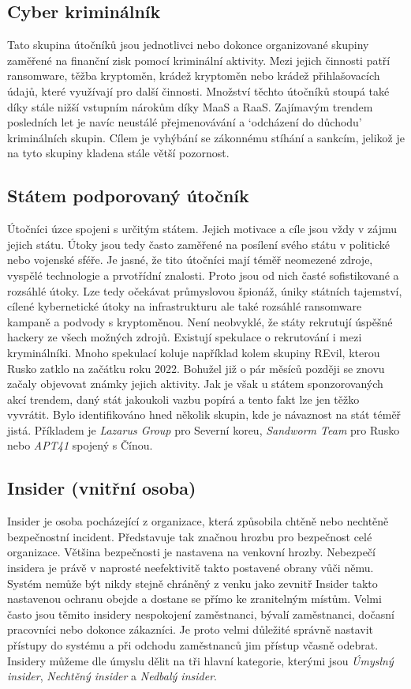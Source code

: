 \subsection{Cyber kriminálník}
Tato skupina útočníků jsou jednotlivci nebo dokonce organizované skupiny zaměřené na finanční zisk pomocí kriminální aktivity.
Mezi jejich činnosti patří ransomware, těžba kryptoměn, krádež kryptoměn nebo krádež přihlašovacích údajů, které využívají pro další činnosti.
Množství těchto útočníků stoupá také díky stále nižší vstupním nárokům díky \ac{MaaS}\cite{MaaS_ATaT} a \ac{RaaS}\cite{RaaS_microsoft}.
Zajímavým trendem posledních let je navíc neustálé přejmenovávání a `odcházení do důchodu' kriminálních skupin.
Cílem je vyhýbání se zákonnému stíhání a sankcím, jelikož je na tyto skupiny kladena stále větší pozornost.

\subsection{Státem podporovaný útočník}
Útočníci úzce spojeni s určitým státem.
Jejich motivace a cíle jsou vždy v zájmu jejich státu.
Útoky jsou tedy často zaměřené na posílení svého státu v politické nebo vojenské sféře.
Je jasné, že tito útočníci mají téměř neomezené zdroje, vyspělé technologie a prvotřídní znalosti.
Proto jsou od nich časté sofistikované a rozsáhlé útoky.
Lze tedy očekávat průmyslovou špionáž, úniky státních tajemství, cílené kybernetické útoky na infrastrukturu ale také rozsáhlé ransomware kampaně a podvody s kryptoměnou.
Není neobvyklé, že státy rekrutují úspěšné hackery ze všech možných zdrojů.
Existují spekulace o rekrutování i mezi kryminálníki.
Mnoho spekulací koluje například kolem skupiny REvil, kterou Rusko zatklo na začátku roku 2022\cite{REvil_story}.
Bohužel již o pár měsíců později se znovu začaly objevovat známky jejich aktivity.
Jak je však u státem sponzorovaných akcí trendem, daný stát jakoukoli vazbu popírá a tento fakt lze jen těžko vyvrátit.
Bylo identifikováno hned několik skupin, kde je návaznost na stát téměř jistá.
Příkladem je \textit{Lazarus Group} pro Severní koreu, \textit{Sandworm Team} pro Rusko nebo \textit{APT41} spojený s Čínou\cite{Mitre_groups}.

\subsection{Insider (vnitřní osoba)}
Insider je osoba pocházející z organizace, která způsobila chtěně nebo nechtěně bezpečnostní incident.
Představuje tak značnou hrozbu pro bezpečnost celé organizace.
Většina bezpečnosti je nastavena na venkovní hrozby.
Nebezpečí insidera je právě v naprosté neefektivitě takto postavené obrany vůči němu.
Systém nemůže být nikdy stejně chráněný z venku jako zevnitř
Insider takto nastavenou ochranu obejde a dostane se přímo ke zranitelným místům.
Velmi často jsou těmito insidery nespokojení zaměstnanci, bývalí zaměstnanci, dočasní pracovníci nebo dokonce zákazníci.
Je proto velmi důležité správně nastavit přístupy do systému a při odchodu zaměstnanců jim přístup včasně odebrat.
Insidery můžeme dle úmyslu dělit na tři hlavní kategorie, kterými jsou \textit{Úmyslný insider}, \textit{Nechtěný insider} a \textit{Nedbalý insider}.

